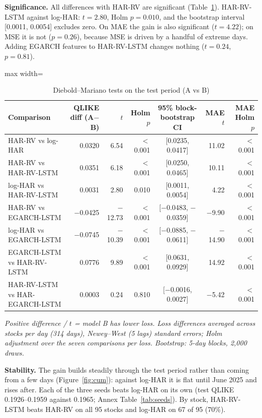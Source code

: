 \documentclass[11pt,a4paper]{article}
\begin{document}
\textbf{Significance.} All differences with HAR-RV are significant (Table~\ref{tab:dm}). HAR-RV-LSTM
against log-HAR: $t=2.80$, Holm $p=0.010$, and the bootstrap interval [0.0011, 0.0054] excludes zero.
On MAE the gain is also significant ($t=4.22$); on MSE it is not ($p=0.26$), because MSE is driven by a
handful of extreme days. Adding EGARCH features to HAR-RV-LSTM changes nothing ($t=0.24$, $p=0.81$).

\begin{table}[htbp]
\centering
\caption{Diebold--Mariano tests on the test period (A vs B)}
\label{tab:dm}
\small
\begin{adjustbox}{max width=\textwidth}
\begin{tabular}{lrrrcrr}
\toprule
Comparison & QLIKE diff (A$-$B) & $t$ & Holm $p$ & 95\% block-bootstrap CI & MAE $t$ & MAE Holm $p$ \\
\midrule
HAR-RV vs log-HAR & 0.0320 & 6.54 & $<$0.001 & [0.0235, 0.0417] & 11.02 & $<$0.001 \\
HAR-RV vs HAR-RV-LSTM & 0.0351 & 6.18 & $<$0.001 & [0.0250, 0.0465] & 10.11 & $<$0.001 \\
log-HAR vs HAR-RV-LSTM & 0.0031 & 2.80 & 0.010 & [0.0011, 0.0054] & 4.22 & $<$0.001 \\
HAR-RV vs EGARCH-LSTM & $-$0.0425 & $-$12.73 & $<$0.001 & [$-$0.0483, $-$0.0359] & $-$9.90 & $<$0.001 \\
log-HAR vs EGARCH-LSTM & $-$0.0745 & $-$10.39 & $<$0.001 & [$-$0.0885, $-$0.0611] & $-$14.90 & $<$0.001 \\
EGARCH-LSTM vs HAR-RV-LSTM & 0.0776 & 9.89 & $<$0.001 & [0.0631, 0.0929] & 14.92 & $<$0.001 \\
HAR-RV-LSTM vs HAR-EGARCH-LSTM & 0.0003 & 0.24 & 0.810 & [$-$0.0016, 0.0027] & $-$5.42 & $<$0.001 \\
\bottomrule
\end{tabular}
\end{adjustbox}
\par\smallskip\parbox{0.95\textwidth}{\footnotesize\itshape Positive difference / $t$ = model B has lower loss. Loss differences averaged across stocks per day (314 days), Newey--West (5 lags) standard errors; Holm adjustment over the seven comparisons per loss. Bootstrap: 5-day blocks, 2,000 draws.}
\end{table}


\textbf{Stability.} The gain builds steadily through the test period rather than coming from a few days
(Figure~\ref{fig:cum}): against log-HAR it is flat until June 2025 and rises after. Each of the three
seeds beats log-HAR on its own (test QLIKE 0.1926--0.1959 against 0.1965; Annex Table~\ref{tab:seeds}).
By stock, HAR-RV-LSTM beats HAR-RV on all 95 stocks and log-HAR on 67 of 95 (70\%).
\end{document}
